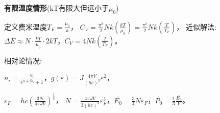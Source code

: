 \documentclass[a4paper,8pt]{extarticle} %
\begin{document}
\begin{multicols}{3}
\textbf{有限温度情形}(kT有限大但远小于$\mu_0$)

定义费米温度$T_F = \frac{\mu_0}{k}$，
$C_V = \frac{\pi^2}{2}Nk\left(\frac{kT}{\mu_0}\right) = \frac{\pi^2}{2}Nk\left(\frac{T}{T_F}\right)$，
近似解法: $\Delta\bar{E} \approx N\cdot\frac{kT}{\mu_0}\cdot 2kT$，$C_V = 4Nk\left(\frac{T}{T_F}\right)$。

相对论情况:

$n_i = \frac{g_i}{e^{\alpha+\beta\varepsilon_i}+1}$，$g(\varepsilon) = J\frac{4\pi V}{(hc)^3}\varepsilon^2$，

$\varepsilon_F = hc\left(\frac{3N}{4\pi JV}\right)^{\frac{1}{3}}$，
$N = \frac{4\pi JV}{3(hc)^3}\varepsilon_F^3$，$\bar{E_0} = \frac{3}{4}N\varepsilon_F$，$\bar{P_0} = \frac{1}{3}\frac{\bar{E_0}}{V}$。
\end{multicols}
\end{document}
